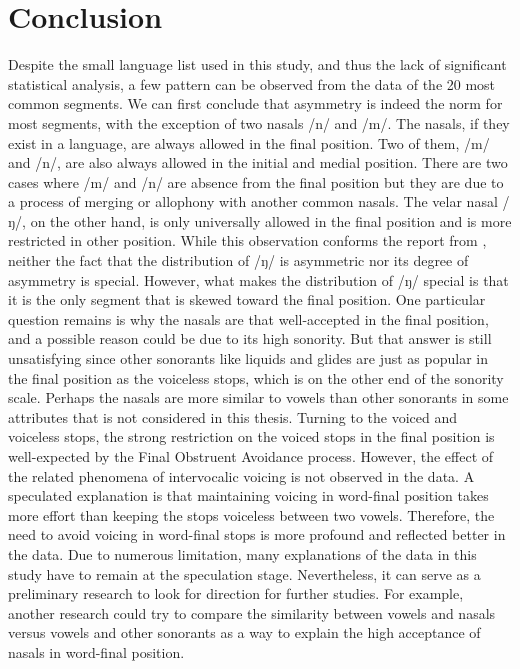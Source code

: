 \section{Conclusion}

Despite the small language list used in this study, and thus the lack of significant statistical analysis, a few pattern can be observed from the data of the 20 most common segments.
We can first conclude that asymmetry is indeed the norm for most segments, with the exception of two nasals /n/ and /m/.
The nasals, if they exist in a language, are always allowed in the final position.
Two of them, /m/ and /n/, are also always allowed in the initial and medial position.
There are two cases where /m/ and /n/ are absence from the final position but they are due to a process of merging or allophony with another common nasals.
The velar nasal /ŋ/, on the other hand, is only universally allowed in the final position and is more restricted in other position.
While this observation conforms the report from \cite{wals-9}, neither the fact that the distribution of /ŋ/ is asymmetric nor its degree of asymmetry is special.
However, what makes the distribution of /ŋ/ special is that it is the only segment that is skewed toward the final position.
One particular question remains is why the nasals are that well-accepted in the final position, and a possible reason could be due to its high sonority.
But that answer is still unsatisfying since other sonorants like liquids and glides are just as popular in the final position as the voiceless stops, which is on the other end of the sonority scale.
Perhaps the nasals are more similar to vowels than other sonorants in some attributes that is not considered in this thesis.
Turning to the voiced and voiceless stops, the strong restriction on the voiced stops in the final position is well-expected by the Final Obstruent Avoidance process.
However, the effect of the related phenomena of intervocalic voicing is not observed in the data.
A speculated explanation is that maintaining voicing in word-final position takes more effort than keeping the stops voiceless between two vowels.
Therefore, the need to avoid voicing in word-final stops is more profound and reflected better in the data.
Due to numerous limitation, many explanations of the data in this study have to remain at the speculation stage.
Nevertheless, it can serve as a preliminary research to look for direction for further studies.
For example, another research could try to compare the similarity between vowels and nasals versus vowels and other sonorants as a way to explain the high acceptance of nasals in word-final position.
